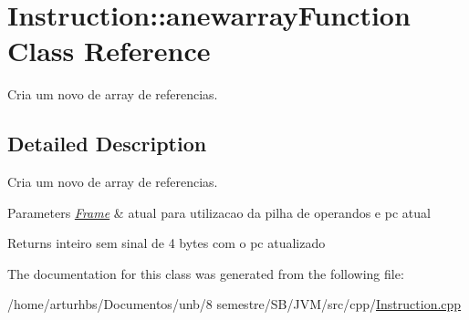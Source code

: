\hypertarget{classInstruction_1_1anewarrayFunction}{}\section{Instruction\+:\+:anewarray\+Function Class Reference}
\label{classInstruction_1_1anewarrayFunction}


Cria um novo de array de referencias.  




\subsection{Detailed Description}
Cria um novo de array de referencias. 


\begin{DoxyParams}{Parameters}
{\em \hyperlink{classFrame}{Frame}} & atual para utilizacao da pilha de operandos e pc atual \\
\hline
\end{DoxyParams}
\begin{DoxyReturn}{Returns}
inteiro sem sinal de 4 bytes com o pc atualizado 
\end{DoxyReturn}


The documentation for this class was generated from the following file\+:\begin{DoxyCompactItemize}
\item 
/home/arturhbs/\+Documentos/unb/8 semestre/\+S\+B/\+J\+V\+M/src/cpp/\hyperlink{Instruction_8cpp}{Instruction.\+cpp}\end{DoxyCompactItemize}
